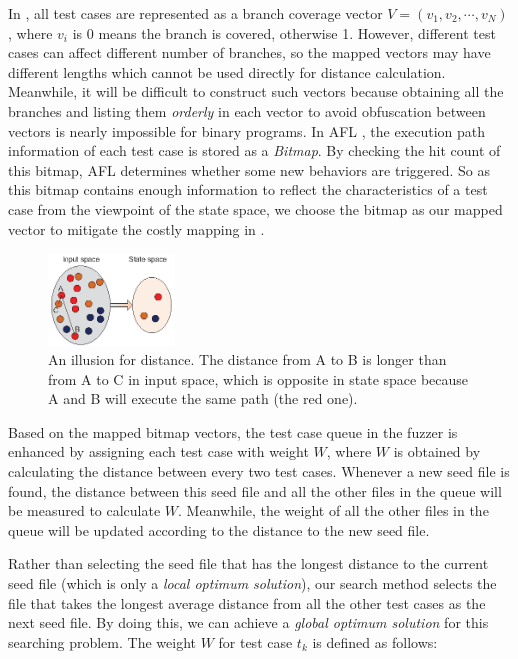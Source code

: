 \documentclass{cta-author}
\begin{document}
In \cite{wang2015similarity}, all test cases are represented as a branch 
coverage vector $\mathit{V}=(v_1, v_2, \cdots, v_N)$, where $v_i$ is 
0 means the branch is covered, otherwise 1. 
However, different test cases can affect different number of branches, 
so the mapped vectors may have different lengths which cannot be used 
directly for distance calculation. Meanwhile, it will be difficult to 
construct such vectors because obtaining all the branches and listing 
them \textit{orderly} in each vector to avoid obfuscation between 
vectors is nearly impossible for binary programs. 
In AFL \cite{online:afl}, the execution path information of each test 
case is stored as a \emph{Bitmap}. By checking the hit count of this 
bitmap, AFL determines whether some new behaviors are triggered. 
So as this bitmap contains enough information to reflect the 
characteristics of a test case from the viewpoint of the state space, 
we choose the bitmap as our mapped vector to mitigate the costly 
mapping in \cite{wang2015similarity}.

\begin{figure}
	\centering
	\includegraphics[width=0.3\textwidth]{distance-illusion.eps} 
	\caption{An illusion for distance. The distance from A to B is longer 
		than from A to C in input space, which is opposite in state space 
		because A and B will execute the same path (the red one).}
	\label{distance-illusion}
\end{figure}

Based on the mapped bitmap vectors, the test case queue in the fuzzer 
is enhanced by assigning each test case with weight $W$, where $W$ is 
obtained by calculating the distance between every two test cases. 
Whenever a new seed file is found, the distance between this seed file 
and all the other files in the queue will be measured to calculate $W$. 
Meanwhile, the weight of all the other files in the queue will be 
updated according to the distance to the new seed file. 

Rather than selecting the seed file that has the longest distance to 
the current seed file (which is only a \emph{local optimum solution}), 
our search method selects the file that takes the longest average 
distance from all the other test cases as the next seed file. By 
doing this, we can achieve a \emph{global optimum solution} for this 
searching problem. The weight $W$ for test case $t_k$ is defined 
as follows:
\end{document}

